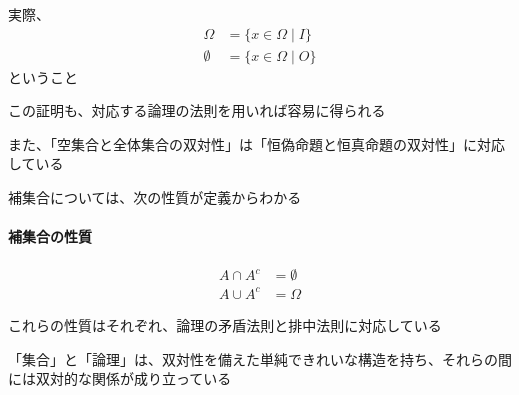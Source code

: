 \documentclass[../book_ronri-and-set]{subfiles}
\begin{document}
実際、
\begin{align*}
  \Omega    & = \{x \in \Omega \mid I\} \\
  \emptyset & = \{x \in \Omega \mid O\}
\end{align*}
ということ

この証明も、対応する論理の法則を用いれば容易に得られる

\br

また、「空集合と全体集合の双対性」は「恒偽命題と恒真命題の双対性」に対応している

\sectionline

補集合については、次の性質が定義からわかる

\begin{oframed}
  \paragraph{補集合の性質}
  \begin{align*}
    A \cap A^c & = \emptyset \\
    A \cup A^c & = \Omega
  \end{align*}
\end{oframed}

これらの性質はそれぞれ、論理の矛盾法則と排中法則に対応している

\sectionline

「集合」と「論理」は、双対性を備えた単純できれいな構造を持ち、それらの間には双対的な関係が成り立っている
\end{document}
